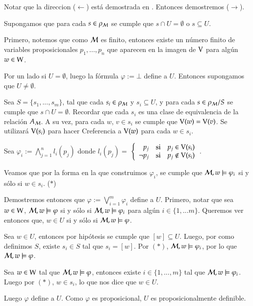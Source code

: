 \begin{demostracion}
    Notar que la direccion ($\leftarrow$) está demostrada en . Entonces demostremos ($\rightarrow$).

    Supongamos que para cada $s \in \rho_{\mathcal{M}}$ se cumple que $s \cap U = \emptyset$ o $s \subseteq U$.

    Primero, notemos que como $\mathcal{M}$ es finito, entonces existe un número finito de variables proposicionales $p_1,...,p_n$ que aparecen en la imagen de $\mathrm{V}$ para algún $w \in \mathrm{W}$.

    Por un lado si $U = \emptyset$, luego la fórmula $ \varphi := \bot$ define a $U$. Entonces supongamos que $U \neq \emptyset$. 
    
    Sea $S = \{s_1,...,s_m\}$, tal que cada $s_i \in \rho_{\mathcal{M}}$ y $s_i \subseteq U$, y para cada $s \in \rho_{\mathcal{M}}/S$ se cumple que $s \cap U = \emptyset$. 
    Recordar que cada $s_i$ es una clase de equivalencia de la relación $A_{\mathcal{M}}$. A su vez, para cada $w$, $v \in s_i$ se cumple que 
    $\mathrm{V}(w) = \mathrm{V}(v)$. Se utilizará $\mathrm{V}(s_i)$ para hacer Creferencia a $\mathrm{V}(w)$ para cada $w \in s_i$.

    Sea $\varphi_i := \bigwedge\limits_{j = 1}^{n} l_i(p_j)$ donde $l_i(p_j) = $
    $\left\{ \begin{array}{rcl}
            p_j & \mbox{si}
            & p_j \in \mathrm{V}(s_i) \\ \neg p_j & \mbox{si} & p_j \notin \mathrm{V}(s_i) \\
            \end{array}\right. 
    $.

    Veamos que por la forma en la que construimos $\varphi_i$, se cumple que $\mathcal{M}, w \models \varphi_i$ si y sólo si $w \in s_i$. ($*$)
    
    Demostremos entonces que $\varphi := \bigvee\limits_{i = 1}^{m}\varphi_i$ define a $U$. Primero, notar que sea $w \in \mathrm{W}$, 
    $\mathcal{M}, w \models \varphi$ si y sólo si $\mathcal{M}, w \models \varphi_i$ para algún $i \in \{1,...m\}$.  
    Queremos ver entonces que, $w \in U$ si y sólo si $\mathcal{M}, w \models \varphi$. 

    Sea $w \in U$, entonces por hipótesis se cumple que $[w] \subseteq U$. Luego, por como definimos $S$, existe $s_i \in S$ tal que 
    $s_i = [w]$. Por $(*)$, $\mathcal{M}, w \models \varphi_i$, por lo que $\mathcal{M}, w \models \varphi$.

    Sea $w \in \mathrm{W}$ tal que $\mathcal{M}, w \models \varphi$, entonces existe $i \in \{1,...,m\}$ tal que $\mathcal{M}, w \models \varphi_i$. 
    Luego por $(*)$, $w \in s_i$, lo que nos dice que $w \in U$.

    Luego $\varphi$ define a $U$. Como $\varphi$ es proposicional, $U$ es proposicionalmente definible.
\end{demostracion}

